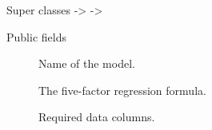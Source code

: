 \documentclass[a4paper]{book}
\begin{document}
%
\begin{Section}{Super classes}
 ->  -> 
\end{Section}
%
\begin{Section}{Public fields}

\begin{description}

\item[] Name of the model.

\item[] The five-factor regression formula.

\item[] Required data columns.

\end{description}


\end{Section}
%
\end{document}

